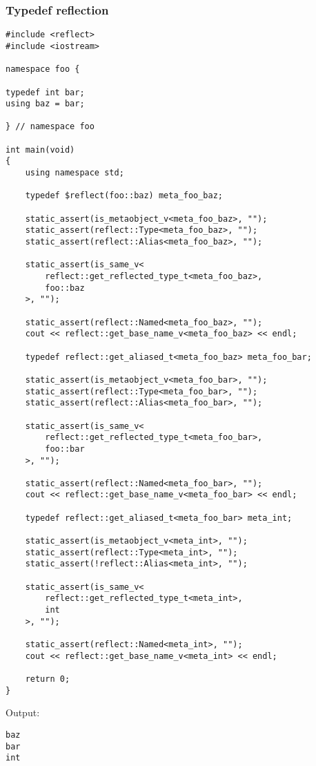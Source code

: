 \subsubsection{Typedef reflection}

\begin{verbatim}
#include <reflect>
#include <iostream>

namespace foo {

typedef int bar;
using baz = bar;

} // namespace foo

int main(void)
{
	using namespace std;

	typedef $reflect(foo::baz) meta_foo_baz;

	static_assert(is_metaobject_v<meta_foo_baz>, "");
	static_assert(reflect::Type<meta_foo_baz>, "");
	static_assert(reflect::Alias<meta_foo_baz>, "");

	static_assert(is_same_v<
		reflect::get_reflected_type_t<meta_foo_baz>,
		foo::baz
	>, "");

	static_assert(reflect::Named<meta_foo_baz>, "");
	cout << reflect::get_base_name_v<meta_foo_baz> << endl;

	typedef reflect::get_aliased_t<meta_foo_baz> meta_foo_bar;

	static_assert(is_metaobject_v<meta_foo_bar>, "");
	static_assert(reflect::Type<meta_foo_bar>, "");
	static_assert(reflect::Alias<meta_foo_bar>, "");

	static_assert(is_same_v<
		reflect::get_reflected_type_t<meta_foo_bar>,
		foo::bar
	>, "");

	static_assert(reflect::Named<meta_foo_bar>, "");
	cout << reflect::get_base_name_v<meta_foo_bar> << endl;

	typedef reflect::get_aliased_t<meta_foo_bar> meta_int;

	static_assert(is_metaobject_v<meta_int>, "");
	static_assert(reflect::Type<meta_int>, "");
	static_assert(!reflect::Alias<meta_int>, "");

	static_assert(is_same_v<
		reflect::get_reflected_type_t<meta_int>,
		int
	>, "");

	static_assert(reflect::Named<meta_int>, "");
	cout << reflect::get_base_name_v<meta_int> << endl;

	return 0;
}

\end{verbatim}

Output:

\begin{verbatim}
baz
bar
int
\end{verbatim}

